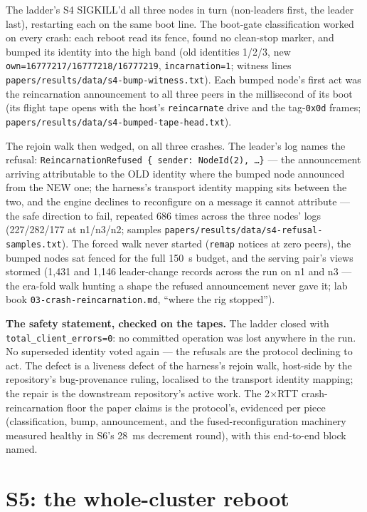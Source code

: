 \documentclass[10pt,journal,letterpaper]{IEEEtran}
\newcommand{\code}[1]{\texttt{\small #1}}
\begin{document}
The ladder's S4 SIGKILL'd all three nodes in turn (non-leaders first,
the leader last), restarting each on the same boot line. The boot-gate
classification worked on every crash: each reboot read its fence,
found no clean-stop marker, and bumped its identity into the high
band (old identities 1/2/3, new \code{own=16777217/16777218/16777219},
\code{incarnation=1}; witness lines
\code{papers/results/data/s4-bump-witness.txt}). Each bumped node's
first act was the reincarnation announcement to all three peers in the
millisecond of its boot (its flight tape opens with the host's
\code{reincarnate} drive and the tag-\code{0x0d} frames;
\code{papers/results/data/s4-bumped-tape-head.txt}).

The rejoin walk then wedged, on all three crashes. The leader's log
names the refusal: \code{ReincarnationRefused \{ sender: NodeId(2),
\ldots\}} --- the announcement arriving attributable to the OLD
identity where the bumped node announced from the NEW one; the
harness's transport identity mapping sits between the two, and the
engine declines to reconfigure on a message it cannot attribute ---
the safe direction to fail, repeated 686 times across the three
nodes' logs (227/282/177 at n1/n3/n2; samples
\code{papers/results/data/s4-refusal-samples.txt}). The forced walk
never started (\code{remap} notices at zero peers), the bumped nodes
sat fenced for the full 150~s budget, and the serving pair's views
stormed (1{,}431 and 1{,}146 leader-change records across the run on
n1 and n3 --- the era-fold walk hunting a shape the refused
announcement never gave it; lab book
\code{03-crash-reincarnation.md}, ``where the rig stopped'').

\textbf{The safety statement, checked on the tapes.} The ladder
closed with \code{total\_client\_errors=0}: no committed operation
was lost anywhere in the run. No superseded identity voted again ---
the refusals are the protocol declining to act. The defect is a
liveness defect of the harness's rejoin walk, host-side by the
repository's bug-provenance ruling, localised to the transport
identity mapping; the repair is the downstream repository's active
work. The 2$\times$RTT crash-reincarnation floor the paper claims is
the protocol's, evidenced per piece (classification, bump,
announcement, and the fused-reconfiguration machinery measured healthy
in S6's 28~ms decrement round), with this end-to-end block named.

\section{S5: the whole-cluster reboot}
\label{sec:s5}
\end{document}
